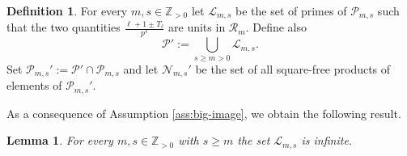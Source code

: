 \documentclass[12pt,reqno]{amsart}
\newtheorem{lemma}[theorem]{Lemma}
\theoremstyle{definition}
\newtheorem{definition}[theorem]{Definition}
\theoremstyle{remark}
\newcommand{\numberset}{\mathbb}
\newcommand{\Z}{\numberset{Z}}
\newcommand{\calR}{\mathcal{R}}
\begin{document}
\begin{definition}\label{dfn:kolyvagin-primes}
    For every $m,s\in\Z_{>0}$ let $\mathcal{L}_{m,s}$ be the set of primes of $\mathcal{P}_{m,s}$ such that the two quantities $\frac{\ell+1\pm T_\ell}{p^s}$ are units in $\calR_m$. Define also
    \begin{equation*}
        \mathcal{P}':=\bigcup_{s\ge m>0} \mathcal{L}_{m,s}.
    \end{equation*}
    Set $\mathcal{P}_{m,s}':=\mathcal{P}'\cap\mathcal{P}_{m,s}$ and let $\mathcal{N}_{m,s}'$ be the set of all square-free products of elements of $\mathcal{P}_{m,s}'$.
\end{definition}

As a consequence of Assumption \ref{ass:big-image}, we obtain the following result.

\begin{lemma}\label{lem:finer-choice-of-primes}
    For every $m,s\in\Z_{>0}$ with $s\ge m$ the set $\mathcal{L}_{m,s}$ is infinite.
\end{lemma}
\end{document}
